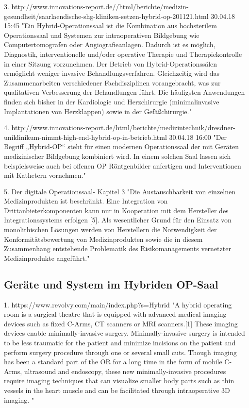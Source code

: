 3. http://www.innovations-report.de//html/berichte/medizin-gesundheit/saarlaendische-shg-kliniken-setzen-hybrid-op-201121.html 30.04.18 15:45	
	"Ein Hybrid-Operationssaal ist die Kombination aus hochsterilem Operationssaal und Systemen zur intraoperativen Bildgebung wie Computertomografen oder Angiografieanlagen. Dadurch ist es möglich, Diagnostik, interventionelle und/oder operative Therapie und Therapiekontrolle in einer Sitzung vorzunehmen.
	Der Betrieb von Hybrid-Operationssälen ermöglicht weniger invasive Behandlungsverfahren. Gleichzeitig wird das Zusammenarbeiten verschiedener Fachdisziplinen vorangebracht, was zur qualitativen Verbesserung der Behandlungen führt. Die häufigsten Anwendungen finden sich bisher in der Kardiologie und Herzchirurgie (minimalinvasive Implantationen von Herzklappen) sowie in der Gefäßchirurgie."
	
4. http://www.innovations-report.de/html/berichte/medizintechnik/dresdner-uniklinikum-nimmt-high-end-hybrid-op-in-betrieb.html 30.04.18 16:00
	"Der Begriff „Hybrid-OP“ steht für einen modernen Operationssaal der mit Geräten medizinischer Bildgebung kombiniert wird. In einem solchen Saal lassen sich beispielsweise auch bei offenen OP Röntgenbilder anfertigen und Interventionen mit Kathetern vornehmen."

5. Der digitale Operationssaal- Kapitel 3
	"Die Austauschbarkeit
	von einzelnen Medizinprodukten ist beschränkt. Eine Integration von Drittanbieterkomponenten
	kann nur in Kooperation mit dem Hersteller des Integrationssystems
	erfolgen [5]. Als wesentlicher Grund für den Einsatz von monolithischen Lösungen
	werden von Herstellern die Notwendigkeit der Konformitätsbewertung von Medizinprodukten
	sowie die in diesem Zusammenhang entstehende Problematik des Risikomanagements
	vernetzter Medizinprodukte angeführt."
\subsection{Geräte und System im Hybriden OP-Saal}
1. https://www.revolvy.com/main/index.php?s=Hybrid%
	"A hybrid operating room is a surgical theatre that is equipped with advanced medical imaging devices such as fixed C-Arms, CT scanners or MRI scanners.[1]
	These imaging devices enable minimally-invasive surgery. Minimally-invasive surgery is intended to be less traumatic for the patient and minimize incisions on the patient and perform surgery procedure through one or several small cuts.
	Though imaging has been a standard part of the OR for a long time in the form of mobile C-Arms, ultrasound and endoscopy, these new minimally-invasive procedures require imaging techniques that can visualize smaller body parts such as thin vessels in the heart muscle and can be facilitated through intraoperative 3D imaging. "
	
